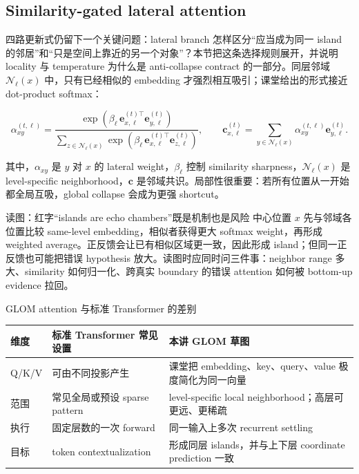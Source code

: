 \subsection{Similarity-gated lateral attention}

四路更新式仍留下一个关键问题：lateral branch 怎样区分“应当成为同一 island 的邻居”和“只是空间上靠近的另一个对象”？本节把这条选择规则展开，并说明 locality 与 temperature 为什么是 anti-collapse contract 的一部分。同层邻域 $\mathcal N_\ell(x)$ 中，只有已经相似的 embedding 才强烈相互吸引；课堂给出的形式接近 dot-product softmax：

\[
\alpha_{xy}^{(t,\ell)}=
\frac{\exp\!\left(\beta_\ell\,\mathbf e_{x,\ell}^{(t)\top}\mathbf e_{y,\ell}^{(t)}\right)}
{\sum_{z\in\mathcal N_\ell(x)}\exp\!\left(\beta_\ell\,\mathbf e_{x,\ell}^{(t)\top}\mathbf e_{z,\ell}^{(t)}\right)},
\qquad
\mathbf c_{x,\ell}^{(t)}=\sum_{y\in\mathcal N_\ell(x)}\alpha_{xy}^{(t,\ell)}\mathbf e_{y,\ell}^{(t)}.
\]

其中，$\alpha_{xy}$ 是 $y$ 对 $x$ 的 lateral weight，$\beta_\ell$ 控制 similarity sharpness，$\mathcal N_\ell(x)$ 是 level-specific neighborhood，$\mathbf c$ 是邻域共识。局部性很重要：若所有位置从一开始都全局互吸，global collapse 会成为更强 shortcut。


\begin{knowledgebox}{读图：红字“islands are echo chambers”既是机制也是风险}
中心位置 $x$ 先与邻域各位置比较 same-level embedding，相似者获得更大 softmax weight，再形成 weighted average。正反馈会让已有相似区域更一致，因此形成 island；但同一正反馈也可能把错误 hypothesis 放大。读图时应同时问三件事：neighbor range 多大、similarity 如何归一化、跨真实 boundary 的错误 attention 如何被 bottom-up evidence 拉回。
\end{knowledgebox}

\begin{knowledgebox}{GLOM attention 与标准 Transformer 的差别}
\begin{tabularx}{\textwidth}{L{0.24\textwidth}L{0.33\textwidth}>{\raggedright\arraybackslash}X}
\toprule
维度 & 标准 Transformer 常见设置 & 本讲 GLOM 草图 \\
\midrule
Q/K/V & 可由不同投影产生 & 课堂把 embedding、key、query、value 极度简化为同一向量 \\
范围 & 常见全局或预设 sparse pattern & level-specific local neighborhood；高层可更远、更稀疏 \\
执行 & 固定层数的一次 forward & 同一输入上多次 recurrent settling \\
目标 & token contextualization & 形成同层 islands，并与上下层 coordinate prediction 一致 \\
\bottomrule
\end{tabularx}
\end{knowledgebox}


